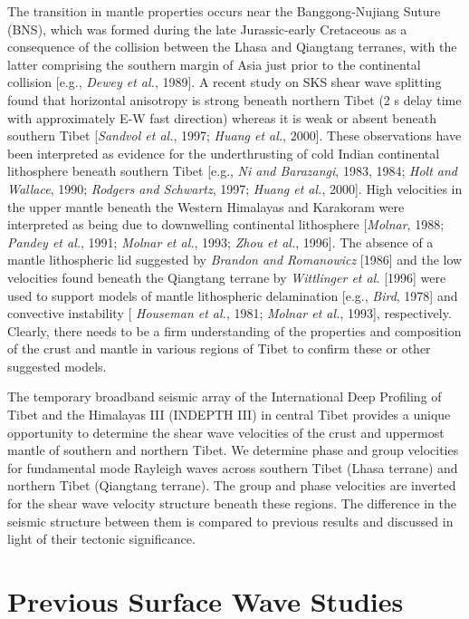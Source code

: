 \documentclass[12pt]{article}
\begin{document}
The transition in mantle properties occurs near the Banggong-Nujiang Suture (BNS), which was formed during
the late Jurassic-early Cretaceous as a consequence of the collision between the Lhasa and Qiangtang
terranes, with the latter comprising the southern margin of Asia just prior to the continental collision
[e.g., {\it Dewey et al.}, 1989].  A recent study on SKS shear wave splitting found that horizontal
anisotropy is strong beneath northern Tibet (2 s delay time with approximately E-W fast direction) whereas
it is weak or absent beneath southern Tibet [{\it Sandvol et al.}, 1997; {\it Huang et al.}, 2000].  These
observations have been interpreted as evidence for the underthrusting of cold Indian continental
lithosphere beneath southern Tibet [e.g., {\it Ni and Barazangi}, 1983, 1984; {\it Holt and Wallace}, 1990;
{\it Rodgers and Schwartz}, 1997; {\it Huang et al.}, 2000].  High velocities in the upper mantle beneath
the Western Himalayas and Karakoram were interpreted as being due to downwelling continental lithosphere
[{\it Molnar}, 1988; {\it Pandey et al.}, 1991; {\it Molnar et al.}, 1993; {\it Zhou et al.}, 1996].  The
absence of a mantle lithospheric lid suggested by {\it Brandon and Romanowicz} [1986] and the low
velocities found beneath the Qiangtang terrane by {\it Wittlinger et al.} [1996] were used to support
models of mantle lithospheric delamination [e.g., {\it Bird}, 1978] and convective instability [{\it
Houseman et al.}, 1981; {\it Molnar et al.}, 1993], respectively.  Clearly, there needs to be a firm
understanding of the properties and composition of the crust and mantle in various regions of Tibet to
confirm these or other suggested models.

The temporary broadband seismic array of the International Deep Profiling of Tibet and the Himalayas III
(INDEPTH III) in central Tibet provides a unique opportunity to determine the shear wave velocities of the
crust and uppermost mantle of southern and northern Tibet. We determine phase and group velocities for
fundamental mode Rayleigh waves across southern Tibet (Lhasa terrane) and northern Tibet (Qiangtang
terrane).  The group and phase velocities are inverted for the shear wave velocity structure beneath these
regions. The difference in the seismic structure between them is compared to previous results and discussed
in light of their tectonic significance.

\section{Previous Surface Wave Studies}
\end{document}
